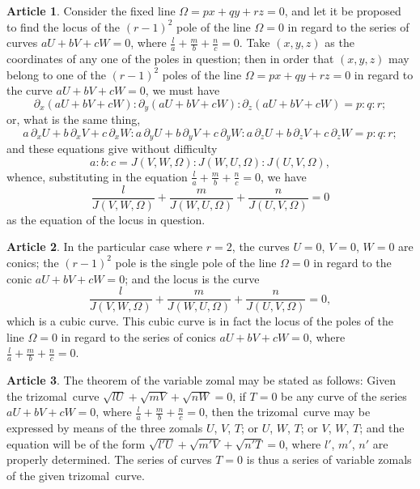 \documentclass[11pt,a4paper]{article}
\theoremstyle{definition}
\newtheorem{art}{Article}
\newcommand{\trizomal}{trizomal}
\begin{document}
\begin{art}
Consider the fixed line $\Omega = px + qy + rz = 0$, and let it be proposed to find the locus of the $(r-1)^{2}$ pole of the line $\Omega = 0$ in regard to the series of curves $aU + bV + cW = 0$, where $\tfrac{l}{a} + \tfrac{m}{b} + \tfrac{n}{c} = 0$. Take $(x, y, z)$ as the coordinates of any one of the poles in question; then in order that $(x, y, z)$ may belong to one of the $(r-1)^{2}$ poles of the line $\Omega = px + qy + rz = 0$ in regard to the curve $aU + bV + cW = 0$, we must have
\[
\partial_{x}(aU + bV + cW) : \partial_{y}(aU + bV + cW) : \partial_{z}(aU + bV + cW) = p : q : r;
\]
or, what is the same thing,
\[
a\,\partial_{x}U + b\,\partial_{x}V + c\,\partial_{x}W : a\,\partial_{y}U + b\,\partial_{y}V + c\,\partial_{y}W : a\,\partial_{z}U + b\,\partial_{z}V + c\,\partial_{z}W = p : q : r;
\]
and these equations give without difficulty
\[
a : b : c = J(V, W, \Omega) : J(W, U, \Omega) : J(U, V, \Omega),
\]
whence, substituting in the equation $\tfrac{l}{a} + \tfrac{m}{b} + \tfrac{n}{c} = 0$, we have
\[
\frac{l}{J(V, W, \Omega)} + \frac{m}{J(W, U, \Omega)} + \frac{n}{J(U, V, \Omega)} = 0
\]
as the equation of the locus in question.
\end{art}

\begin{art}
In the particular case where $r = 2$, the curves $U = 0$, $V = 0$, $W = 0$ are conics; the $(r-1)^{2}$ pole is the single pole of the line $\Omega = 0$ in regard to the conic $aU + bV + cW = 0$; and the locus is the curve
\[
\frac{l}{J(V, W, \Omega)} + \frac{m}{J(W, U, \Omega)} + \frac{n}{J(U, V, \Omega)} = 0,
\]
which is a cubic curve. This cubic curve is in fact the locus of the poles of the line $\Omega = 0$ in regard to the series of conics $aU + bV + cW = 0$, where $\tfrac{l}{a} + \tfrac{m}{b} + \tfrac{n}{c} = 0$.
\end{art}

\begin{art}
The theorem of the variable zomal may be stated as follows: Given the \trizomal\ curve $\sqrt{lU} + \sqrt{mV} + \sqrt{nW} = 0$, if $T = 0$ be any curve of the series $aU + bV + cW = 0$, where $\tfrac{l}{a} + \tfrac{m}{b} + \tfrac{n}{c} = 0$, then the \trizomal\ curve may be expressed by means of the three zomals $U$, $V$, $T$; or $U$, $W$, $T$; or $V$, $W$, $T$; and the equation will be of the form $\sqrt{l'U} + \sqrt{m'V} + \sqrt{n'T} = 0$, where $l'$, $m'$, $n'$ are properly determined. The series of curves $T = 0$ is thus a series of variable zomals of the given \trizomal\ curve.
\end{art}
\end{document}
